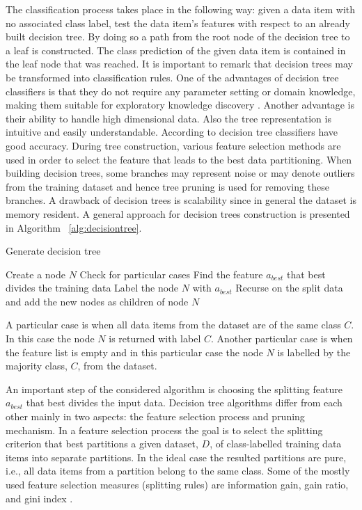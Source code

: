 The classification process takes place in the following way: given a data item with no associated class label, test the data item's features with respect to an already built decision tree. By doing so a path from the root node of the decision tree to a leaf is constructed. The class prediction of the given data item is contained in the leaf node that was reached. It is important to remark that decision trees may be transformed into classification rules. One of the advantages of decision tree classifiers is that they do not require any parameter setting or domain knowledge, making them suitable for exploratory knowledge discovery \cite{Han06DataMining}. Another advantage is their ability to handle high dimensional data. Also the tree representation is intuitive and easily understandable. According to \cite{Han06DataMining} decision tree classifiers have good accuracy. During tree construction, various feature selection methods are used in order to select the feature that leads to the best data partitioning. When building decision trees, some branches may represent noise or may denote outliers from the training dataset and hence tree pruning is used for removing these branches. A drawback of decision trees is scalability since in general the dataset is memory resident. A general approach for decision trees construction is presented in Algorithm ~\ref{alg:decisiontree}.

\begin{algorithm}
\caption{Generate decision tree}
\label{alg:decisiontree}
\begin{algorithmic}[1]
\STATE Create a node $N$
\STATE Check for particular cases
\STATE Find the feature $a_{best}$ that best divides the training data
\STATE Label the node $N$ with $a_{best}$
\STATE Recurse on the split data and add the new nodes as children of node $N$
\end{algorithmic}
\end{algorithm}

A particular case is when all data items from the dataset are of the same class $C$. In this case the node $N$ is returned with label $C$. Another particular case is when the feature list is empty and in this particular case the node $N$ is labelled by the majority class, $C$, from the dataset.

An important step of the considered algorithm is choosing the splitting feature $a_{best}$ that best divides the input data.
Decision tree algorithms differ from each other mainly in two aspects: the feature selection process and pruning mechanism.
In a feature selection process the goal is to select the splitting criterion that best partitions a given dataset, $D$, of class-labelled training data items into separate partitions. 
In the ideal case the resulted partitions are pure, i.e., all data items from a partition belong to the same class.
Some of the mostly used feature selection measures (splitting rules) are information gain, gain ratio, and gini index \cite{Han06DataMining}.

